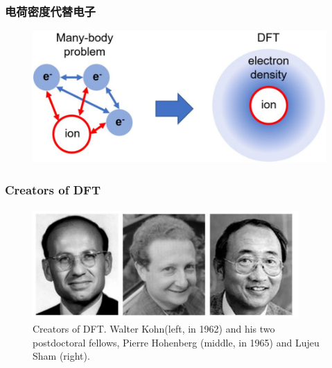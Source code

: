 \frame
{
	\frametitle{电荷密度代替电子}
\begin{figure}[h!]
\centering
\vspace{3.5pt}
\includegraphics[height=0.45\textwidth,width=1.0\textwidth,viewport=0 0 950 440,clip]{Figures/Schematic-illustration-of-transforming-many_electron-system-to-electron-density.png}
\caption{\fontsize{6.0pt}{4.5pt}}
\label{Density-Particle}
\end{figure}
}

\frame
{
	\frametitle{\rm{Creators of DFT}}
\begin{figure}[h!]
\vskip 10pt
\centering
\includegraphics[height=1.65in,width=4.0in,viewport=0 0 1562 610,clip]{Figures/Creators_of_DFT.png}
\caption{\tiny \textrm{Creators of DFT. Walter Kohn(left, in 1962) and his two postdoctoral fellows, Pierre Hohenberg (middle, in 1965) and Lujeu Sham (right).}}%
\label{Creator_of_DFT}
\end{figure}
}

